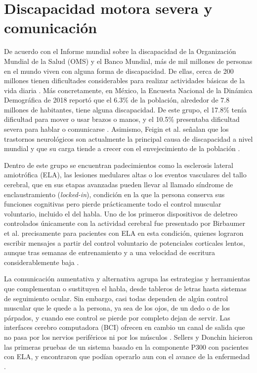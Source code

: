 \section[DISCAPACIDAD MOTORA SEVERA Y COMUNICACIÓN]{Discapacidad motora severa y comunicación}

De acuerdo con el Informe mundial sobre la discapacidad de la Organización Mundial de la Salud
(OMS) y el Banco Mundial, más de mil millones de personas en el mundo viven con alguna forma de
discapacidad. De ellas, cerca de 200 millones tienen dificultades considerables para realizar
actividades básicas de la vida diaria \cite{oms2011}. Más concretamente, en México, la Encuesta
Nacional de la Dinámica Demográfica de 2018 reportó que el 6.3\% de la población, alrededor de 7.8
millones de habitantes, tiene alguna discapacidad. De este grupo, el 17.8\% tenía dificultad para
mover o usar brazos o manos, y el 10.5\% presentaba dificultad severa para hablar o comunicarse
\cite{inegi2018}. Asimismo, 
Feigin et al. señalan que los trastornos neurológicos son actualmente la principal causa
de discapacidad a nivel mundial y que su carga tiende a crecer con el envejecimiento de la
población \cite{feigin2020}.

Dentro de este grupo se encuentran padecimientos como la esclerosis lateral amiotrófica (ELA), las
lesiones medulares altas o los eventos vasculares del tallo cerebral, que en sus etapas avanzadas
pueden llevar al llamado síndrome de enclaustramiento (\textit{locked-in}), condición en la que la
persona conserva sus funciones cognitivas pero pierde prácticamente todo el control muscular
voluntario, incluido el del habla. Uno de los primeros dispositivos de deletreo controlados
únicamente con la actividad cerebral fue presentado por Birbaumer et al. precisamente para
pacientes con ELA en esta condición, quienes lograron escribir mensajes a partir del control
voluntario de potenciales corticales lentos, aunque tras semanas de entrenamiento y a una
velocidad de escritura considerablemente baja \cite{birbaumer1999}.

La comunicación aumentativa y alternativa agrupa las estrategias y herramientas que complementan o
sustituyen el habla, desde tableros de letras hasta sistemas de seguimiento ocular. Sin embargo,
casi todas dependen de algún control muscular que le quede a la persona, ya sea de los ojos, de un
dedo o de los párpados, y cuando ese control se pierde por completo dejan de servir. Las interfaces
cerebro computadora (BCI) ofrecen en cambio un canal de salida que no pasa por los nervios
periféricos ni por los músculos \cite{wolpaw2002}. Sellers y Donchin hicieron las primeras pruebas
de un sistema basado en la componente P300 con pacientes con ELA, y encontraron que podían operarlo
aun con el avance de la enfermedad \cite{sellers2006}.
